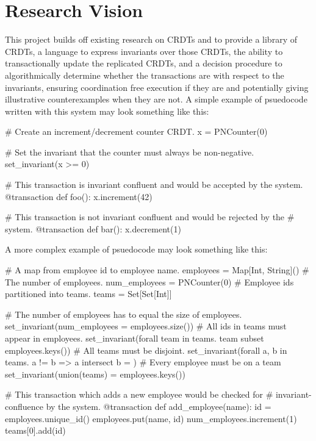 \section{Research Vision}
This project builds off existing research on CRDTs and \iconfluence{} to
provide a library of CRDTs, a language to express invariants over those CRDTs,
the ability to transactionally update the replicated CRDTs, and a decision
procedure to algorithmically determine whether the transactions are
\iconfluent{} with respect to the invariants, ensuring coordination free
execution if they are and potentially giving illustrative counterexamples when
they are not. A simple example of psuedocode written with this system may look
something like this:

\begin{Python}
# Create an increment/decrement counter CRDT.
x = PNCounter(0)

# Set the invariant that the counter must always be non-negative.
set_invariant(x >= 0)

# This transaction is invariant confluent and would be accepted by the system.
@transaction
def foo():
  x.increment(42)

# This transaction is not invariant confluent and would be rejected by the
# system.
@transaction
def bar():
  x.decrement(1)
\end{Python}

A more complex example of psuedocode may look something like this:

\begin{Python}
# A map from employee id to employee name.
employees = Map[Int, String]()
# The number of employees.
num_employees = PNCounter(0)
# Employee ids partitioned into teams.
teams = Set[Set[Int]]

# The number of employees has to equal the size of employees.
set_invariant(num_employees = employees.size())
# All ids in teams must appear in employees.
set_invariant(forall team in teams. team subset employees.keys())
# All teams must be disjoint.
set_invariant(forall a, b in teams. a != b => a intersect b = {})
# Every employee must be on a team
set_invariant(union(teams) = employees.keys())

# This transaction which adds a new employee would be checked for
# invariant-confluence by the system.
@transaction
def add_employee(name):
  id = employees.unique_id()
  employees.put(name, id)
  num_employees.increment(1)
  teams[0].add(id)
\end{Python}

